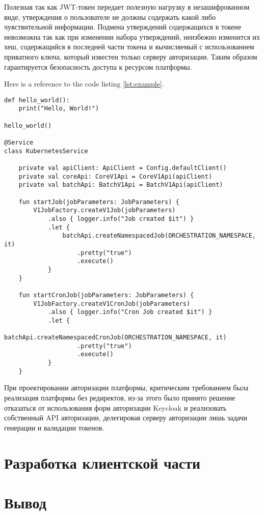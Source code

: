 Полезная так как JWT-токен передает полезную нагрузку в незашифрованном виде, утверждения о пользователе не должны содержать какой либо чувствительной информации.
Подмена утверждений содержащихся в токене невозможна так как при изменении набора утверждений, неизбежно изменится их хеш, содержащийся в последней части токена и вычисляемый с использованием приватного ключа, который известен только серверу авторизации. Таким образом гарантируется безопасность доступа к ресурсом платформы.

Here is a reference to the code listing \ref{lst:example}.

\begin{lstlisting}[caption={Hello World in Python}, label=lst:example]
def hello_world():
    print("Hello, World!")
    
hello_world()

@Service
class KubernetesService 

    private val apiClient: ApiClient = Config.defaultClient()
    private val coreApi: CoreV1Api = CoreV1Api(apiClient)
    private val batchApi: BatchV1Api = BatchV1Api(apiClient)

    fun startJob(jobParameters: JobParameters) {
        V1JobFactory.createV1Job(jobParameters)
            .also { logger.info("Job created $it") }
            .let {
                batchApi.createNamespacedJob(ORCHESTRATION_NAMESPACE, it)
                    .pretty("true")
                    .execute()
            }
    }

    fun startCronJob(jobParameters: JobParameters) {
        V1JobFactory.createV1CronJob(jobParameters)
            .also { logger.info("Cron Job created $it") }
            .let {
                batchApi.createNamespacedCronJob(ORCHESTRATION_NAMESPACE, it)
                    .pretty("true")
                    .execute()
            }
    }
\end{lstlisting}

При проектировании авторизации платформы, критическим требованием была реализация платформы без редиректов, из-за этого было принято решение отказаться от использования форм авторизации Keycloak и реализовать собственный API авторизации, делегировав серверу авторизации лишь задачи генерации и валидации токенов.
 
\section{Разработка клиентской части}

\section{Вывод}